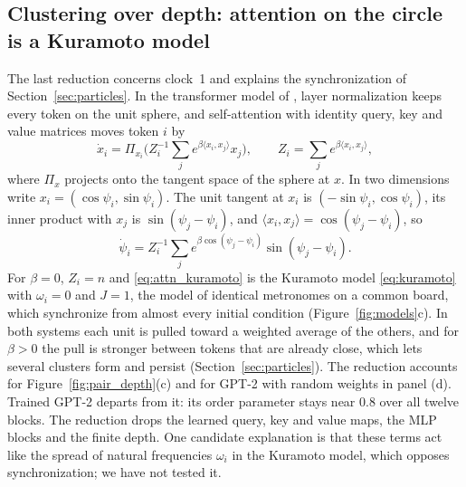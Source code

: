 \subsection{Clustering over depth: attention on the circle is a Kuramoto model}
\label{sec:kuramoto}

The last reduction concerns clock~1 and explains the synchronization of Section~\ref{sec:particles}. In the transformer model of \citet{geshkovski2023mathematical}, layer normalization keeps every token on the unit sphere, and self-attention with identity query, key and value matrices moves token $i$ by
\begin{equation*}
\dot x_i=\Pi_{x_i}\Big(Z_i^{-1}\sum_j e^{\beta\langle x_i,x_j\rangle}x_j\Big),\qquad Z_i=\sum_j e^{\beta\langle x_i,x_j\rangle},
\end{equation*}
where $\Pi_x$ projects onto the tangent space of the sphere at $x$. In two dimensions write $x_i=(\cos\psi_i,\sin\psi_i)$. The unit tangent at $x_i$ is $(-\sin\psi_i,\cos\psi_i)$, its inner product with $x_j$ is $\sin(\psi_j-\psi_i)$, and $\langle x_i,x_j\rangle=\cos(\psi_j-\psi_i)$, so
\begin{equation}
\dot\psi_i=Z_i^{-1}\sum_j e^{\beta\cos(\psi_j-\psi_i)}\sin(\psi_j-\psi_i).
\label{eq:attn_kuramoto}
\end{equation}
For $\beta=0$, $Z_i=n$ and \eqref{eq:attn_kuramoto} is the Kuramoto model \eqref{eq:kuramoto} with $\omega_i=0$ and $J=1$, the model of identical metronomes on a common board, which synchronize from almost every initial condition (Figure~\ref{fig:models}c). In both systems each unit is pulled toward a weighted average of the others, and for $\beta>0$ the pull is stronger between tokens that are already close, which lets several clusters form and persist (Section~\ref{sec:particles}). The reduction accounts for Figure~\ref{fig:pair_depth}(c) and for GPT-2 with random weights in panel (d). Trained GPT-2 departs from it: its order parameter stays near 0.8 over all twelve blocks. The reduction drops the learned query, key and value maps, the MLP blocks and the finite depth. One candidate explanation is that these terms act like the spread of natural frequencies $\omega_i$ in the Kuramoto model, which opposes synchronization; we have not tested it.
